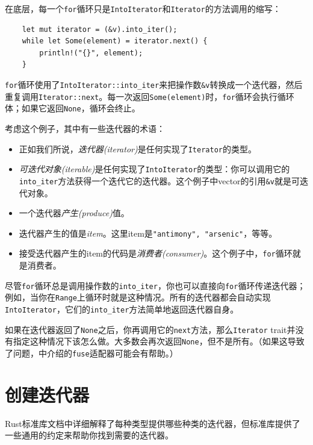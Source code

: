 在底层，每一个\texttt{for}循环只是\texttt{IntoIterator}和\texttt{Iterator}的方法调用的缩写：
\begin{verbatim}
    let mut iterator = (&v).into_iter();
    while let Some(element) = iterator.next() {
        println!("{}", element);
    }
\end{verbatim}

\texttt{for}循环使用了\texttt{IntoIterator::into\_iter}来把操作数\texttt{\&v}转换成一个迭代器，然后重复调用\texttt{Iterator::next}。每一次返回\texttt{Some(element)}时，\texttt{for}循环会执行循环体；如果它返回\texttt{None}，循环会终止。

考虑这个例子，其中有一些迭代器的术语：
\begin{itemize}
    \item 正如我们所说，\emph{迭代器(iterator)}是任何实现了\texttt{Iterator}的类型。
    \item \emph{可迭代对象(iterable)}是任何实现了\texttt{IntoIterator}的类型：你可以调用它的\texttt{into\_iter}方法获得一个迭代它的迭代器。这个例子中vector的引用\texttt{\&v}就是可迭代对象。
    \item 一个迭代器\emph{产生(produce)}值。
    \item 迭代器产生的值是\emph{item}。这里item是\texttt{"antimony", "arsenic"}，等等。
    \item 接受迭代器产生的item的代码是\emph{消费者(consumer)}。这个例子中，\texttt{for}循环就是消费者。
\end{itemize}

尽管\texttt{for}循环总是调用操作数的\texttt{into\_iter}，你也可以直接向\texttt{for}循环传递迭代器；例如，当你在\texttt{Range}上循环时就是这种情况。所有的迭代器都会自动实现\texttt{IntoIterator}，它们的\texttt{into\_iter}方法简单地返回迭代器自身。

如果在迭代器返回了\texttt{None}之后，你再调用它的\texttt{next}方法，那么\texttt{Iterator} trait并没有指定这种情况下该怎么做。大多数会再次返回\texttt{None}，但不是所有。（如果这导致了问题，中介绍的\texttt{fuse}适配器可能会有帮助。）

\section{创建迭代器}
Rust标准库文档中详细解释了每种类型提供哪些种类的迭代器，但标准库提供了一些通用的约定来帮助你找到需要的迭代器。

